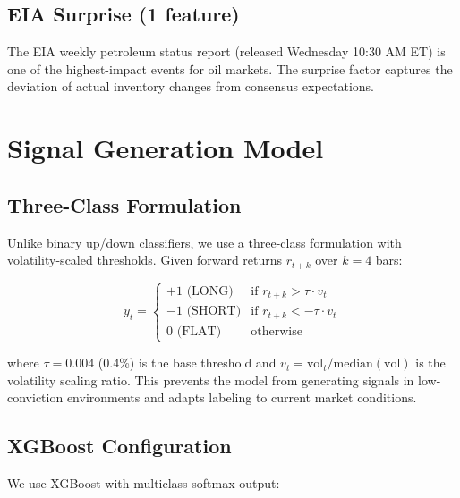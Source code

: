 \documentclass[12pt,a4paper]{article}
\begin{document}
\subsection{EIA Surprise (1 feature)}

The EIA weekly petroleum status report (released Wednesday 10:30 AM ET) is one of the highest-impact events for oil markets. The surprise factor captures the deviation of actual inventory changes from consensus expectations.

\section{Signal Generation Model}
\label{sec:model}

\subsection{Three-Class Formulation}

Unlike binary up/down classifiers, we use a three-class formulation with volatility-scaled thresholds. Given forward returns $r_{t+k}$ over $k=4$ bars:

\begin{equation}
    y_t = \begin{cases}
        +1 \text{ (LONG)} & \text{if } r_{t+k} > \tau \cdot v_t \\
        -1 \text{ (SHORT)} & \text{if } r_{t+k} < -\tau \cdot v_t \\
        0 \text{ (FLAT)} & \text{otherwise}
    \end{cases}
\end{equation}

where $\tau = 0.004$ (0.4\%) is the base threshold and $v_t = \text{vol}_t / \text{median}(\text{vol})$ is the volatility scaling ratio. This prevents the model from generating signals in low-conviction environments and adapts labeling to current market conditions.

\subsection{XGBoost Configuration}

We use XGBoost \citep{chen2016xgboost} with multiclass softmax output:
\end{document}
